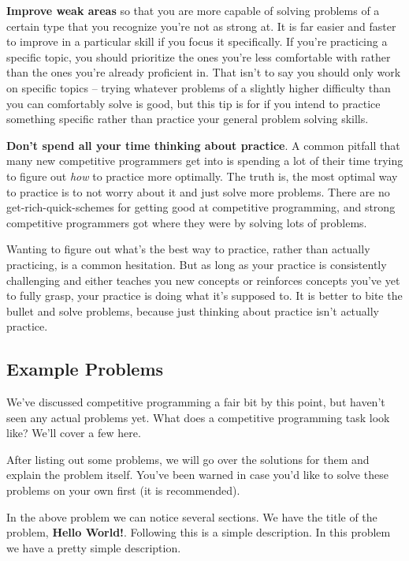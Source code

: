 \textbf{Improve weak areas} so that you are more capable of solving problems of a certain type that you recognize you're not as strong at. It is far easier and faster to improve in a particular skill if you focus it specifically. If you're practicing a specific topic, you should prioritize the ones you're less comfortable with rather than the ones you're already proficient in. That isn't to say you should only work on specific topics -- trying whatever problems of a slightly higher difficulty than you can comfortably solve is good, but this tip is for if you intend to practice something specific rather than practice your general problem solving skills.

\textbf{Don't spend all your time thinking about practice}. A common pitfall that many new competitive programmers get into is spending a lot of their time trying to figure out \textit{how} to practice more optimally. The truth is, the most optimal way to practice is to not worry about it and just solve more problems. There are no get-rich-quick-schemes for getting good at competitive programming, and strong competitive programmers got where they were by solving lots of problems.

Wanting to figure out what's the best way to practice, rather than actually practicing, is a common hesitation. But as long as your practice is consistently challenging and either teaches you new concepts or reinforces concepts you've yet to fully grasp, your practice is doing what it's supposed to. It is better to bite the bullet and solve problems, because just thinking about practice isn't actually practice.

\subsection{Example Problems}

We've discussed competitive programming a fair bit by this point, but haven't seen any actual problems yet. What does a competitive programming task look like? We'll cover a few here.

After listing out some problems, we will go over the solutions for them and explain the problem itself. You've been warned in case you'd like to solve these problems on your own first (it is recommended).

\hrulefill



\hrulefill

In the above problem we can notice several sections. We have the title of the problem, \textbf{Hello World!}. Following this is a simple description. In this problem we have a pretty simple description.

